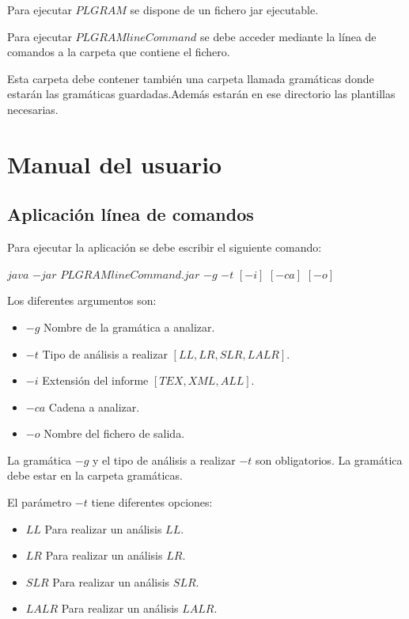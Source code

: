 Para ejecutar $PLGRAM$ se dispone de un fichero jar ejecutable.


Para ejecutar $PLGRAMlineCommand$ se debe acceder mediante la línea de comandos a la carpeta que contiene el fichero.

Esta carpeta debe contener también una carpeta llamada gramáticas donde estarán las gramáticas guardadas.Además estarán en ese directorio las plantillas necesarias.

\section{Manual del usuario}

\subsection{Aplicación línea de comandos}

Para ejecutar la aplicación se debe escribir el siguiente comando:

 $java$ $-jar$ $PLGRAMlineCommand.jar$ $-g$ $-t$ $[-i]$ $[-ca]$ $[-o]$
 
 Los diferentes argumentos son:
 \begin{itemize}
 	\item $-g$ Nombre de la gramática a analizar.
 	\item $-t$ Tipo de análisis a realizar $[LL,LR,SLR,LALR].$
 	\item $-i$ Extensión del informe $[TEX, XML, ALL]$.
 	\item $-ca$ Cadena a analizar.
 	\item $-o$ Nombre del fichero de salida.
 	
\end{itemize} 



La gramática $-g$ y el tipo de análisis a realizar $-t$ son obligatorios. La gramática debe estar en la carpeta gramáticas.
 
El parámetro $-t$ tiene diferentes opciones:
  \begin{itemize}
 	 \item $LL$ Para realizar un análisis $LL$.
 	 \item $LR$ Para realizar un análisis $LR$.
 	 \item $SLR$ Para realizar un análisis $SLR$.
 	 \item $LALR$ Para realizar un análisis $LALR$.
 \end{itemize}
  
